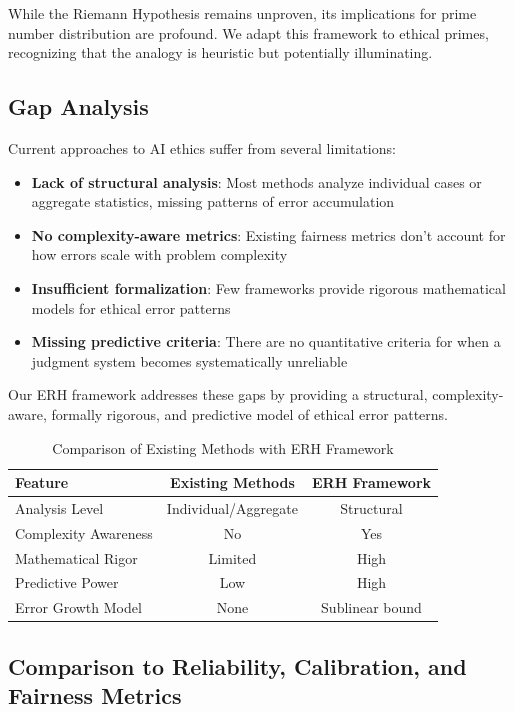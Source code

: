 \documentclass[12pt,a4paper]{article}
\theoremstyle{definition}
\theoremstyle{remark}
\begin{document}
While the Riemann Hypothesis remains unproven, its implications for prime number distribution are profound. We adapt this framework to ethical primes, recognizing that the analogy is heuristic but potentially illuminating.

\subsection{Gap Analysis}

Current approaches to AI ethics suffer from several limitations:
\begin{itemize}
    \item \textbf{Lack of structural analysis}: Most methods analyze individual cases or aggregate statistics, missing patterns of error accumulation
    \item \textbf{No complexity-aware metrics}: Existing fairness metrics don't account for how errors scale with problem complexity
    \item \textbf{Insufficient formalization}: Few frameworks provide rigorous mathematical models for ethical error patterns
    \item \textbf{Missing predictive criteria}: There are no quantitative criteria for when a judgment system becomes systematically unreliable
\end{itemize}

Our ERH framework addresses these gaps by providing a structural, complexity-aware, formally rigorous, and predictive model of ethical error patterns.

\begin{table}[htbp]
\centering
\caption{Comparison of Existing Methods with ERH Framework}
\label{tab:comparison}
\begin{tabular}{lcc}
\toprule
\textbf{Feature} & \textbf{Existing Methods} & \textbf{ERH Framework} \\
\midrule
Analysis Level & Individual/Aggregate & Structural \\
Complexity Awareness & No & Yes \\
Mathematical Rigor & Limited & High \\
Predictive Power & Low & High \\
Error Growth Model & None & Sublinear bound \\
\bottomrule
\end{tabular}
\end{table}

\subsection{Comparison to Reliability, Calibration, and Fairness Metrics}
\label{subsec:comparison_calibration}
\end{document}
